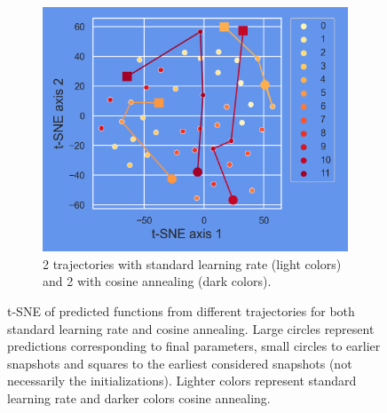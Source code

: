 \begin{figure}[H]
	\begin{subfigure}{.45\textwidth}
		\centering
		\includegraphics[width=.9\linewidth]{./figs/preds_tSNE_2.png}  
		\caption{2 trajectories with standard learning rate (light colors) and 2 with cosine annealing (dark colors).}
		\label{fig:sub-second}
	\end{subfigure}
	\caption{t-SNE of predicted functions from different trajectories for both standard learning rate and cosine annealing. Large circles represent predictions corresponding to final parameters, small circles to earlier snapshots and squares to the earliest considered snapshots (not necessarily the initializations). Lighter colors represent standard learning rate and darker colors cosine annealing.}
	\label{fig:fig}
\end{figure}

